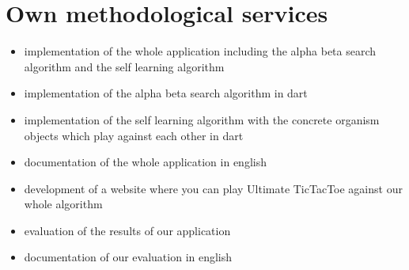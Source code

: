 %
%
%


\section{Own methodological services}
\begin{itemize}
    \item implementation of the whole application including the alpha beta search algorithm and the self learning algorithm
    \item implementation of the alpha beta search algorithm in dart
    \item implementation of the self learning algorithm with the concrete organism objects which play against each other in dart
    \item documentation of the whole application in english
    \item development of a website where you can play Ultimate TicTacToe against our whole algorithm
    \item evaluation of the results of our application
    \item documentation of our evaluation in english
\end{itemize}


